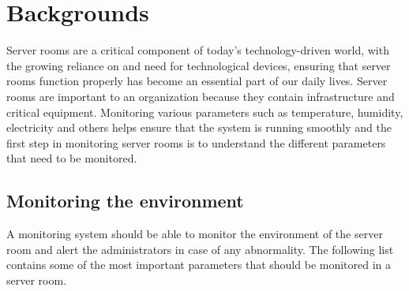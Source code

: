 
\section{Backgrounds}
Server rooms are a critical component of today's technology-driven world, with the growing reliance on and need for technological devices, ensuring that server rooms function properly has become an essential part of our daily lives. Server rooms are important to an organization because they contain infrastructure and critical equipment. Monitoring various parameters such as temperature, humidity, electricity and others helps ensure that the system is running smoothly and the first step in monitoring server rooms is to understand the different parameters that need to be monitored. 
\subsection{Monitoring the environment}
    A monitoring system should be able to monitor the environment of the server room and alert the administrators in case of any abnormality. The following list contains some of the most important parameters that should be monitored in a server room.
